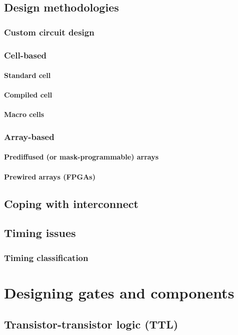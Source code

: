 \documentclass{report}
\begin{document}
\section{Design methodologies}
\subsection{Custom circuit design}
\subsection{Cell-based}
\subsubsection{Standard cell}
\subsubsection{Compiled cell}
\subsubsection{Macro cells}
\subsection{Array-based}
\subsubsection{Prediffused (or mask-programmable) arrays}
\subsubsection{Prewired arrays (FPGAs)}
\section{Coping with interconnect}
\section{Timing issues}
\subsection{Timing classification}

\chapter{Designing gates and components}
\section{Transistor-transistor logic (TTL)}
\end{document}
